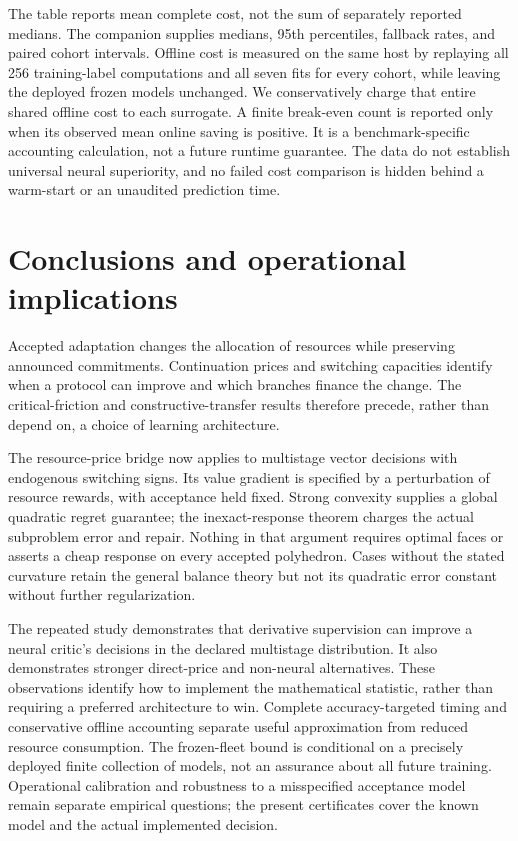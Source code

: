 \documentclass[11pt,letterpaper]{article}
\theoremstyle{definition}
\newcommand{\1}{\mathbf 1}
\begin{document}

The table reports mean complete cost, not the sum of separately reported medians. The companion supplies medians, 95th percentiles, fallback rates, and paired cohort intervals. Offline cost is measured on the same host by replaying all 256 training-label computations and all seven fits for every cohort, while leaving the deployed frozen models unchanged. We conservatively charge that entire shared offline cost to each surrogate. A finite break-even count is reported only when its observed mean online saving is positive. It is a benchmark-specific accounting calculation, not a future runtime guarantee. The data do not establish universal neural superiority, and no failed cost comparison is hidden behind a warm-start or an unaudited prediction time.


\section{Conclusions and operational implications}
Accepted adaptation changes the allocation of resources while preserving announced commitments. Continuation prices and switching capacities identify when a protocol can improve and which branches finance the change. The critical-friction and constructive-transfer results therefore precede, rather than depend on, a choice of learning architecture.

The resource-price bridge now applies to multistage vector decisions with endogenous switching signs. Its value gradient is specified by a perturbation of resource rewards, with acceptance held fixed. Strong convexity supplies a global quadratic regret guarantee; the inexact-response theorem charges the actual subproblem error and repair. Nothing in that argument requires optimal faces or asserts a cheap response on every accepted polyhedron. Cases without the stated curvature retain the general balance theory but not its quadratic error constant without further regularization.

The repeated study demonstrates that derivative supervision can improve a neural critic's decisions in the declared multistage distribution. It also demonstrates stronger direct-price and non-neural alternatives. These observations identify how to implement the mathematical statistic, rather than requiring a preferred architecture to win. Complete accuracy-targeted timing and conservative offline accounting separate useful approximation from reduced resource consumption. The frozen-fleet bound is conditional on a precisely deployed finite collection of models, not an assurance about all future training. Operational calibration and robustness to a misspecified acceptance model remain separate empirical questions; the present certificates cover the known model and the actual implemented decision.
\end{document}
